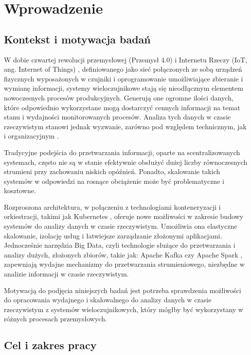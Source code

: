 \section{Wprowadzenie}
\label{sec:wprowadzenie}

\subsection{Kontekst i motywacja badań}
\label{subsec:kontekst}

W dobie czwartej rewolucji przemysłowej (Przemysł 4.0) \cite{przemysl40_iot_ogolnie} i Internetu Rzeczy (IoT, ang. Internet of Things) \cite{iot_definition_aws}, definiowanego jako sieć połączonych ze sobą urządzeń fizycznych wyposażonych w czujniki i oprogramowanie umożliwiające zbieranie i wymianę informacji, systemy wieloczujnikowe stają się nieodłącznym 
elementem nowoczesnych procesów produkcyjnych. Generują one ogromne ilości danych, które odpowiednio wykorzystane mogą dostarczyć
cennych informacji na temat stanu i wydajności monitorowanych procesów. Analiza tych danych w czasie rzeczywistym stanowi jednak
wyzwanie, zarówno pod względem technicznym, jak i organizacyjnym \cite{realtime_challenges}.

Tradycyjne podejścia do przetwarzania informacji, oparte na scentralizowanych systemach, często nie są w stanie efektywnie obsłużyć
dużej liczby równoczesnych strumieni przy zachowaniu niskich opóźnień. Ponadto, skalowanie takich systemów w odpowiedzi na rosnące
obciążenie może być problematyczne i kosztowne.

Rozproszona architektura, w połączeniu z technologiami konteneryzacji i orkiestracji, takimi jak Kubernetes \cite{kubernetes_benefits},
oferuje nowe możliwości w zakresie budowy systemów do analizy danych w czasie rzeczywistym. Umożliwia ona elastyczne skalowanie,
izolację usług i łatwiejsze zarządzanie złożonymi aplikacjami. Jednocześnie narzędzia Big Data, czyli technologie służące do przetwarzania i analizy dużych, złożonych zbiorów, takie jak: Apache Kafka czy Apache Spark \cite{kafka, spark_streaming}, zapewniają
wydajne mechanizmy do przetwarzania strumieniowego, niezbędne w analizie informacji w czasie rzeczywistym.

Motywacją do podjęcia niniejszych badań jest potrzeba sprawdzenia możliwości do opracowania wydajnego i skalowalnego do
analizy danych w czasie rzeczywistym z systemów wieloczujnikowych, który mógłby być wykorzystany w różnych procesach przemysłowych.

\subsection{Cel i zakres pracy}
\label{subsec:cel}

